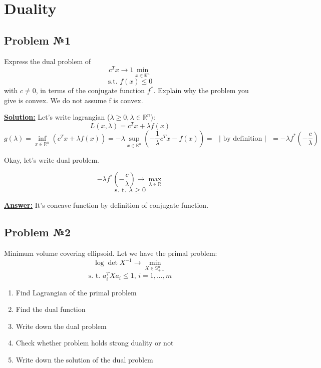 \section{Duality}

\subsection{Problem №1}
Express the dual problem of
\begin{equation*}
    c^Tx \rightarrow 1\min_{x \in \mathds{R}^n}
\end{equation*}
\begin{equation*}
    \text{s.t. } f(x) \leq 0
\end{equation*}
with $c \not = 0$, in terms of the conjugate function $f^*$. Explain why the problem you give is convex. We do not assume f is convex.

\underline{\textbf{Solution:}}
Let's write lagrangian ($\lambda \geq 0, \lambda \in \mathds{R}^n$):
\begin{equation*}
    L(x, \lambda) = c^Tx + \lambda f(x) 
\end{equation*}
\begin{equation*}
    g(\lambda) = \inf_{x \in \mathds{R}^n}(c^Tx + \lambda f(x)) = - \lambda \sup_{x \in \mathds{R}^n} (-\frac{1}{\lambda}c^Tx - f(x)) = \text{ } | \text{ by definition } | \text{ } = - \lambda f^*(-\frac{c}{\lambda}) 
\end{equation*}

Okay, let's write dual problem.

\begin{equation*}
    -\lambda f^*(-\frac{c}{\lambda}) \rightarrow \max_{\lambda \in \mathds{R}}
\end{equation*}
\begin{equation*}
    \text{s. t. } \lambda \geq 0
\end{equation*}

\underline{\textbf{Answer:}} It's concave function by definition of conjugate function.

\subsection{Problem №2}
Minimum volume covering ellipsoid. Let we have the primal problem:
\begin{equation*}
    \log \det X^{-1} \rightarrow \min_{X \in \mathds{S}_{++}^n}
\end{equation*}
\begin{equation*}
    \text{s. t. } a_i^TXa_i \leq 1 \text{, } i = 1, ..., m
\end{equation*}
\begin{enumerate}
    \item Find Lagrangian of the primal problem
    \item Find the dual function
    \item Write down the dual problem
    \item Check whether problem holds strong duality or not
    \item Write down the solution of the dual problem
\end{enumerate}

